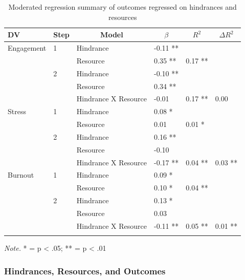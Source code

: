 \documentclass[
  man,mask]{apa7}
\begin{document}
\begin{table}[tbp]

\begin{center}
\begin{threeparttable}

\caption{\label{tab:hind-resource-table}Moderated regression summary of outcomes regressed on hindrances and resources}

\begin{tabular}{llllll}
\toprule
DV & \multicolumn{1}{c}{Step} & \multicolumn{1}{c}{Model} & \multicolumn{1}{c}{$\beta$} & \multicolumn{1}{c}{$R^2$} & \multicolumn{1}{c}{$\Delta R^2$}\\
\midrule
Engagement & 1 & Hindrance & -0.11 ** &  & \\
 &  & Resource & 0.35 ** & 0.17 ** & \\
 & 2 & Hindrance & -0.10 ** &  & \\
 &  & Resource & 0.34 ** &  & \\
 &  & Hindrance X Resource & -0.01 & 0.17 ** & 0.00\\
Stress & 1 & Hindrance & 0.08 * &  & \\
 &  & Resource & 0.01 & 0.01 * & \\
 & 2 & Hindrance & 0.16 ** &  & \\
 &  & Resource & -0.10 &  & \\
 &  & Hindrance X Resource & -0.17 ** & 0.04 ** & 0.03 **\\
Burnout & 1 & Hindrance & 0.09 * &  & \\
 &  & Resource & 0.10 * & 0.04 ** & \\
 & 2 & Hindrance & 0.13 * &  & \\
 &  & Resource & 0.03 &  & \\
 &  & Hindrance X Resource & -0.11 ** & 0.05 ** & 0.01 **\\
\bottomrule
\addlinespace
\end{tabular}

\begin{tablenotes}[para]
\normalsize{\textit{Note.} * = p < .05; ** = p < .01}
\end{tablenotes}

\end{threeparttable}
\end{center}

\end{table}

\hypertarget{hindrances-resources-and-outcomes}{%
\subsubsection{Hindrances, Resources, and Outcomes}\label{hindrances-resources-and-outcomes}}
\end{document}
